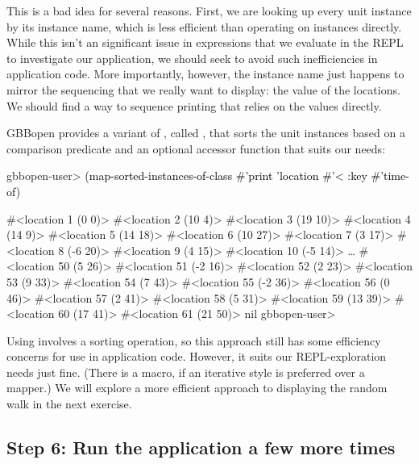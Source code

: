 \documentclass[10pt,twoside,english,pdftex]{article}
\begin{document}
This is a bad idea for several reasons.  First, we are looking up every
 unit instance by its instance name, which is less
efficient than operating on  instances directly.  While
this isn't an significant issue in expressions that we evaluate in the REPL to
investigate our application, we should seek to avoid such inefficiencies in
application code.  More importantly, however, the 
instance name just happens to mirror the sequencing that we really want to
display: the  value of the locations.  We should find a way to
sequence  printing that relies on the  values
directly.

%
%
GBBopen provides a variant of , called
, that sorts the unit instances
based on a comparison predicate and an optional  accessor function
that suits our needs:
%
\W\supp
\begin{example}
\textcolor{darkergray}{%
  gbbopen-user> \textcolor{black}{(map-sorted-instances-of-class #'print 'location #'< 
                   :key #'time-of)}

  #<location 1 (0 0)> 
  #<location 2 (10 4)> 
  #<location 3 (19 10)> 
  #<location 4 (14 9)> 
  #<location 5 (14 18)> 
  #<location 6 (10 27)> 
  #<location 7 (3 17)> 
  #<location 8 (-6 20)> 
  #<location 9 (4 15)> 
  #<location 10 (-5 14)> 
     \textrm{\ldots{}}
  #<location 50 (5 26)> 
  #<location 51 (-2 16)> 
  #<location 52 (2 23)> 
  #<location 53 (9 33)> 
  #<location 54 (7 43)> 
  #<location 55 (-2 36)> 
  #<location 56 (0 46)> 
  #<location 57 (2 41)> 
  #<location 58 (5 31)> 
  #<location 59 (13 39)> 
  #<location 60 (17 41)> 
  #<location 61 (21 50)> 
  nil
  gbbopen-user>}
\end{example}

%
%
Using  involves a sorting
operation, so this approach still has some efficiency concerns for use in
application code.  However, it suits our REPL-exploration needs just fine.
(There is a  macro, if an
iterative style is preferred over a mapper.)  We will explore a more efficient
approach to displaying the random walk in the next exercise.

\subsection*{Step 6:  Run the application a few more times}
\end{document}

